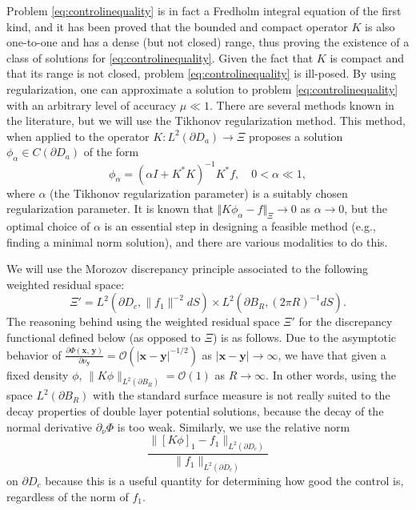 \documentclass[11pt]{amsart}
\theoremstyle{definition}
\theoremstyle{definition}
\theoremstyle{definition}
\begin{document}
Problem \eqref{eq:controlinequality} is in fact a Fredholm integral equation of the first kind, and it has been proved that the bounded and compact operator $K$ is also one-to-one and has a dense (but not closed) range, thus proving the existence of a class of solutions for \eqref{eq:controlinequality}. Given the fact that $K$ is compact and that its range is not closed, problem \eqref{eq:controlinequality} is ill-posed. By using regularization, one can approximate a solution to problem \eqref{eq:controlinequality} with an arbitrary level of accuracy $\mu \ll 1$. There are several methods known in the literature, but we will use the Tikhonov regularization method. This method, when applied to the operator $K:L^2(\partial D_a)\rightarrow \Xi$ proposes a solution $\phi_{\alpha}\in C(\partial D_{a})$ of the form 
\begin{equation}
\label{Tikhonov}
\phi_{\alpha}=(\alpha I+K^*K)^{-1}K^*f, \quad 0<\alpha \ll 1,
\end{equation}
where $\alpha$ (the Tikhonov regularization parameter) is a suitably chosen regularization parameter. It is known that $\Vert K\phi_\alpha-f\Vert_\Xi\rightarrow 0$ as $\alpha\rightarrow 0$, but the optimal choice of $\alpha$ is an essential step in designing a feasible method (e.g., finding a minimal norm solution), and there are various modalities to do this. 

We will use the Morozov discrepancy principle associated to the following weighted residual space:
\begin{equation}
\label{space-Xi'}
\Xi' = L^{2}(\partial D_{c}, \|f_{1}\|^{-2}dS) \times L^{2}(\partial B_{R}, (2\pi R)^{-1}dS).
\end{equation}
The reasoning behind using the weighted residual space $\Xi'$ for the discrepancy functional defined below (as opposed to $\Xi$) is as follows. Due to the asymptotic behavior of $\frac{\partial \Phi(\mathbf{x},\, \mathbf{y})}{\partial \nu_{\mathbf{y}}} = \mathcal{O}(|\mathbf{x}-\mathbf{y}|^{-1/2})$ as $|\mathbf{x}-\mathbf{y}| \to \infty$, we have that given a fixed density $\phi$, $\|K\phi\|_{L^{2}(\partial B_{R})} = \mathcal{O}(1)$ as $R \to \infty$. In other words, using the space $L^{2}(\partial B_{R})$ with the standard surface measure is not really suited to the decay properties of double layer potential solutions, because the decay of the normal derivative $\partial_{\nu}\Phi$ is too weak. Similarly, we use the relative norm
\begin{equation}
\label{eq:F1}
\frac{\|[K\phi]_{1} - f_{1}\|_{L^{2}(\partial D_{c})}}{\|f_{1}\|_{L^{2}(\partial D_{c})}}
\end{equation}
on $\partial D_{c}$ because this is a useful quantity for determining how good the control is, regardless of the norm of $f_{1}$. 
\end{document}

